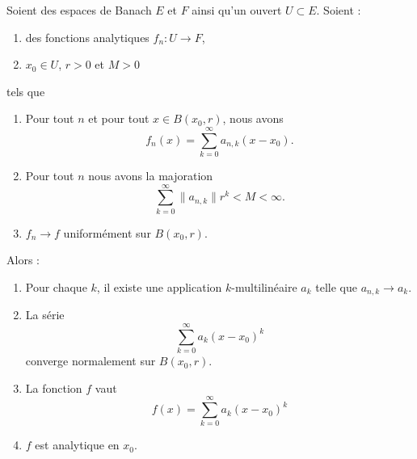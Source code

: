 \begin{theorem}	\label{THOooZHXMooICpUZx}
	Soient des espaces de Banach \( E\) et \( F\) ainsi qu'un ouvert \( U\subset E\). Soient :
	\begin{enumerate}
		\item
		      des fonctions analytiques \(f_n \colon U\to F  \),
		\item
		      \( x_0\in U\), \( r>0\) et \( M>0\)
	\end{enumerate}
	tels que
	\begin{enumerate}
		\item
		      Pour tout \( n\) et pour tout \( x\in B(x_0,r)\), nous avons
		      \begin{equation}
			      f_n(x)=\sum_{k=0}^{\infty}a_{n,k}(x-x_0).
		      \end{equation}
		\item		\label{ITEMooISLSooIfUEXH}
		      Pour tout \( n\) nous avons la majoration
		      \begin{equation}
			      \sum_{k=0}^{\infty}\| a_{n,k} \|r^k<M<\infty.
		      \end{equation}
		\item
		      \( f_n\to f\) uniformément sur \( B(x_0,r)\).
	\end{enumerate}
	Alors :
	\begin{enumerate}
		\item		\label{ITEMooIKWBooXwNBoU}
		      Pour chaque \( k\), il existe une application \( k\)-multilinéaire \( a_k\) telle que \( a_{n,k}\to a_k\).
		\item		\label{ITEMooIDSZooUjZgRl}
		      La série
		      \begin{equation}
			      \sum_{k=0}^{\infty}a_k(x-x_0)^k
		      \end{equation}
		      converge normalement sur \( B(x_0,r)\).
		\item
		      La fonction \( f\) vaut
		      \begin{equation}
			      f(x)=\sum_{k=0}^{\infty}a_k(x-x_0)^k
		      \end{equation}
		\item
		      \( f\) est analytique en \( x_0\).
	\end{enumerate}
\end{theorem}

